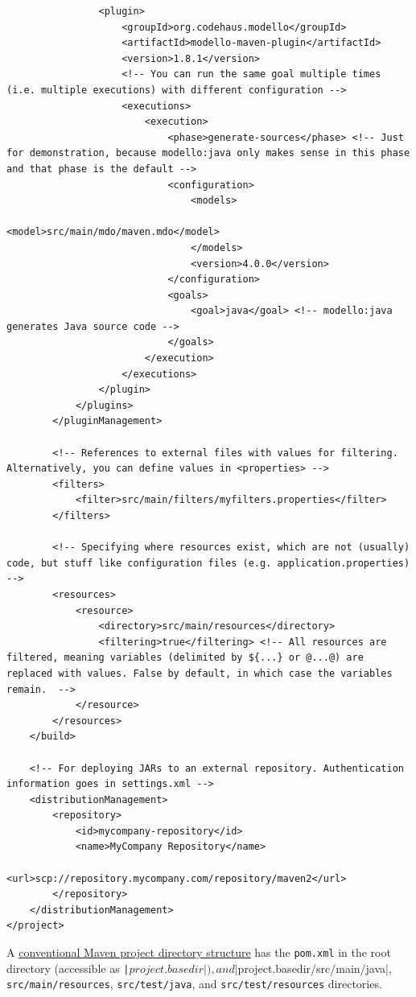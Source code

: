 \documentclass[table, xcdraw]{article}%
\begin{document}
\begin{verbatim}
                <plugin>
                    <groupId>org.codehaus.modello</groupId>
                    <artifactId>modello-maven-plugin</artifactId>
                    <version>1.8.1</version>
                    <!-- You can run the same goal multiple times (i.e. multiple executions) with different configuration -->
                    <executions>
                        <execution>
                            <phase>generate-sources</phase> <!-- Just for demonstration, because modello:java only makes sense in this phase and that phase is the default -->
                            <configuration>
                                <models>
                                    <model>src/main/mdo/maven.mdo</model>
                                </models>
                                <version>4.0.0</version>
                            </configuration>
                            <goals>
                                <goal>java</goal> <!-- modello:java generates Java source code -->
                            </goals>
                        </execution>
                    </executions>
                </plugin>
            </plugins>
        </pluginManagement>

        <!-- References to external files with values for filtering. Alternatively, you can define values in <properties> -->
        <filters>
            <filter>src/main/filters/myfilters.properties</filter>
        </filters>

        <!-- Specifying where resources exist, which are not (usually) code, but stuff like configuration files (e.g. application.properties) -->
        <resources>
            <resource>
                <directory>src/main/resources</directory>
                <filtering>true</filtering> <!-- All resources are filtered, meaning variables (delimited by ${...} or @...@) are replaced with values. False by default, in which case the variables remain.  -->
            </resource>
        </resources>
    </build>

    <!-- For deploying JARs to an external repository. Authentication information goes in settings.xml -->
    <distributionManagement>
        <repository>
            <id>mycompany-repository</id>
            <name>MyCompany Repository</name>
            <url>scp://repository.mycompany.com/repository/maven2</url>
        </repository>
    </distributionManagement>
</project>
\end{verbatim}

A \href{https://maven.apache.org/guides/introduction/introduction-to-the-standard-directory-layout.html}{conventional Maven project directory structure} has the \texttt{pom.xml} in the root directory (accessible as \texttt|${project.basedir}|), and \texttt|${project.basedir}/src/main/java|, \texttt{src/main/resources}, \texttt{src/test/java}, and \texttt{src/test/resources} directories.
\end{document}

